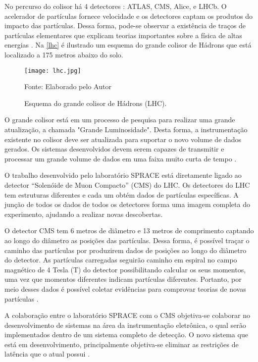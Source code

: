 No percurso do colisor há 4 detectores : ATLAS, CMS, Alice, e LHCb. O acelerador de partículas fornece velocidade e os detectores captam os produtos do impacto das partículas. Dessa forma, pode-se observar a existência de traços de partículas elementares que explicam teorias importantes sobre a física de altas energias \cite{Ferreira2009}. Na \autoref{lhc} é ilustrado um esquema do grande colisor de Hádrons que está localizado a 175 metros abaixo do solo.

\begin{figure}[H]
	\caption{\label{lhc} Esquema do grande colisor de Hádrons (LHC).}
	\centering
	\texttt{[image: lhc.jpg]}
	\begin{center}
		Fonte: Elaborado pelo Autor
	\end{center}	
\end{figure}

O grande colisor está em um processo de pesquisa para realizar uma grande atualização, a chamada "Grande Luminosidade". Desta forma, a instrumentação existente no colisor deve ser atualizada para suportar o novo volume de dados gerados. Os sistemas desenvolvidos devem serem capazes de transmitir e processar um grande volume de dados em uma faixa muito curta de tempo \cite{Lucio2018}. 

O trabalho desenvolvido pelo laboratório SPRACE está diretamente ligado ao detector “Solenóide de Muon Compacto” (CMS) do LHC. Os detectores do LHC tem estruturas diferentes e cada um obtém dados de partículas específicas. A junção de todos os dados de todos os detectores forma uma imagem completa do experimento, ajudando a realizar novas descobertas. 

O detector CMS tem 6 metros de diâmetro e 13 metros de comprimento captando ao longo do diâmetro as posições das partículas. Dessa forma, é possível traçar o caminho das partículas por produzirem dados de posições ao longo do diâmetro do detector. As partículas carregadas seguirão caminho em espiral no campo magnético de 4 Tesla (T) do detector possibilitando calcular os seus momentos, uma vez que momentos diferentes indicam partículas diferentes. Portanto, por meio desses dados é possível coletar evidências para comprovar teorias de novas partículas \cite{Emanuel2018}.

A colaboração entre o laboratório SPRACE com o CMS objetiva-se colaborar no desenvolvimento de sistemas na área da instrumentação eletrônica, o qual serão implementados dentro de um sistema completo de detecção. O novo sistema que está em desenvolvimento, principalmente objetiva-se eliminar as restrições de latência que o atual possui \cite{Cms2018}.

